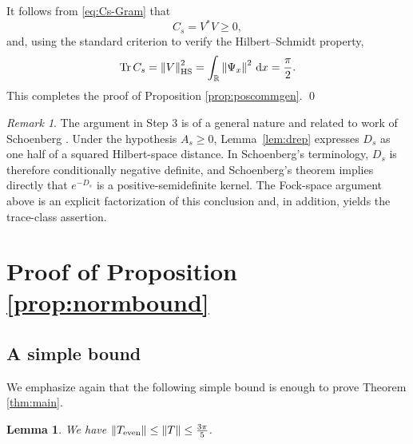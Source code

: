 \documentclass[11pt]{article}
\newtheorem{lemma}[theorem]{Lemma}
\theoremstyle{definition}
\theoremstyle{remark}
\newtheorem{remark}[theorem]{Remark}
\newcommand{\R}{\mathbb{R}}
\newcommand{\norm}[1]{\left\lVert #1\right\rVert}
\newcommand{\dd}{\,\mathrm{d}}
\begin{document}
It follows from \eqref{eq:Cs-Gram} that
\[
C_s=V^*V\geq0,
\]
and, using the standard criterion to verify the Hilbert--Schmidt property,
\[
\operatorname{Tr}C_s=\norm{V}_{\rm HS}^2=\int_{\R}\norm{\Psi_x}^2\dd x=\frac\pi2.
\]
This completes the proof of Proposition \ref{prop:poscommgen}.
\qed

\begin{remark}
    The argument in Step 3 is of a general nature and related to work of Schoenberg \cite{Schoenberg}. Under the hypothesis $A_s\geq0$, Lemma~\ref{lem:drep} expresses
$D_s$ as one half of a squared Hilbert-space distance.  In
Schoenberg's terminology, $D_s$ is therefore conditionally negative
definite, and Schoenberg's theorem \cite{Schoenberg} implies directly
that $e^{-D_s}$ is a positive-semidefinite kernel.  The Fock-space
argument above is an explicit factorization of this conclusion and,
in addition, yields the trace-class assertion.
\end{remark}



\section{Proof of Proposition \ref{prop:normbound}}\label{sec:normbound}

\subsection{A simple bound}

We emphasize again that the following simple bound is enough to prove Theorem \ref{thm:main}.

\begin{lemma}\label{lem:k-bound}
    We have $\|T_{\rm even}\| \leq \|T\| \leq \frac{3\pi}5$.
\end{lemma}
\end{document}
